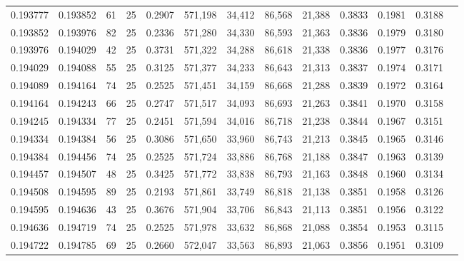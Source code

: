 \begin{tabular}{rrrrrrrrrrrrr}
0.193777 & 0.193852 &  61 &  25 &                                     0.2907 & 571,198 &  34,412 &  86,568 &  21,388 & 0.3833 & 0.1981 & 0.3188 \\
0.193852 & 0.193976 &  82 &  25 &                                     0.2336 & 571,280 &  34,330 &  86,593 &  21,363 & 0.3836 & 0.1979 & 0.3180 \\
0.193976 & 0.194029 &  42 &  25 &                                     0.3731 & 571,322 &  34,288 &  86,618 &  21,338 & 0.3836 & 0.1977 & 0.3176 \\
0.194029 & 0.194088 &  55 &  25 &                                     0.3125 & 571,377 &  34,233 &  86,643 &  21,313 & 0.3837 & 0.1974 & 0.3171 \\
0.194089 & 0.194164 &  74 &  25 &                                     0.2525 & 571,451 &  34,159 &  86,668 &  21,288 & 0.3839 & 0.1972 & 0.3164 \\
0.194164 & 0.194243 &  66 &  25 &                                     0.2747 & 571,517 &  34,093 &  86,693 &  21,263 & 0.3841 & 0.1970 & 0.3158 \\
0.194245 & 0.194334 &  77 &  25 &                                     0.2451 & 571,594 &  34,016 &  86,718 &  21,238 & 0.3844 & 0.1967 & 0.3151 \\
0.194334 & 0.194384 &  56 &  25 &                                     0.3086 & 571,650 &  33,960 &  86,743 &  21,213 & 0.3845 & 0.1965 & 0.3146 \\
0.194384 & 0.194456 &  74 &  25 &                                     0.2525 & 571,724 &  33,886 &  86,768 &  21,188 & 0.3847 & 0.1963 & 0.3139 \\
0.194457 & 0.194507 &  48 &  25 &                                     0.3425 & 571,772 &  33,838 &  86,793 &  21,163 & 0.3848 & 0.1960 & 0.3134 \\
0.194508 & 0.194595 &  89 &  25 &                                     0.2193 & 571,861 &  33,749 &  86,818 &  21,138 & 0.3851 & 0.1958 & 0.3126 \\
0.194595 & 0.194636 &  43 &  25 &                                     0.3676 & 571,904 &  33,706 &  86,843 &  21,113 & 0.3851 & 0.1956 & 0.3122 \\
0.194636 & 0.194719 &  74 &  25 &                                     0.2525 & 571,978 &  33,632 &  86,868 &  21,088 & 0.3854 & 0.1953 & 0.3115 \\
0.194722 & 0.194785 &  69 &  25 &                                     0.2660 & 572,047 &  33,563 &  86,893 &  21,063 & 0.3856 & 0.1951 & 0.3109 \\

\end{tabular}
